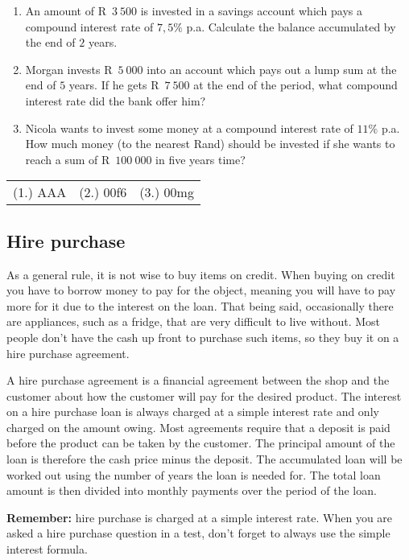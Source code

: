 \begin{exercises}{}{
    \begin{enumerate}[label=\textbf{\arabic*}.]
	\item An amount of R~$3~500$ is invested in a savings account which pays a compound interest rate of $7,5\%$ p.a. Calculate the balance accumulated by the end of $2$ years.

	\item Morgan invests R~$5~000$ into an account which pays out a lump sum at the end of $5$ years. If he gets R~$7~500$ at the end of the period, what compound interest rate did the bank offer him?

	\item Nicola wants to invest some money at a compound interest rate of $11\%$ p.a. How much money (to the nearest Rand) should be invested if she wants to reach a sum of R~$100~000$ in five years time?\\
    \end{enumerate}
\practiceinfo

    \begin{tabularx}{\textwidth}{ XXX }
	(1.)	AAA&	(2.) 00f6&	(3.) 00mg
    \end{tabularx}
}
\end{exercises}


\subsection{Hire purchase}

As a general rule, it is not wise to buy items on credit. When buying
on credit you have to borrow money to pay for the object, meaning you
will have to pay more for it due to the interest on the loan. That
being said, occasionally there are appliances, such as a fridge, that
are very difficult to live without. Most people don't have the cash up
front to purchase such items, so they buy it on a hire purchase
agreement.

A hire purchase agreement is a financial agreement between the shop
and the customer about how the customer will pay for the desired
product. The interest on a hire purchase loan is always charged at a
simple interest rate and only charged on the amount owing. Most
agreements require that a deposit is paid before the product can be
taken by the customer. The principal amount of the loan is therefore
the cash price minus the deposit. The accumulated loan will be worked
out using the number of years the loan is needed for. The total loan
amount is then divided into monthly payments over the period of the
loan.
\par
\textbf{Remember:} hire purchase is charged at a simple interest rate. When you are asked a hire purchase question in a test, don't forget to always use the simple interest formula.

